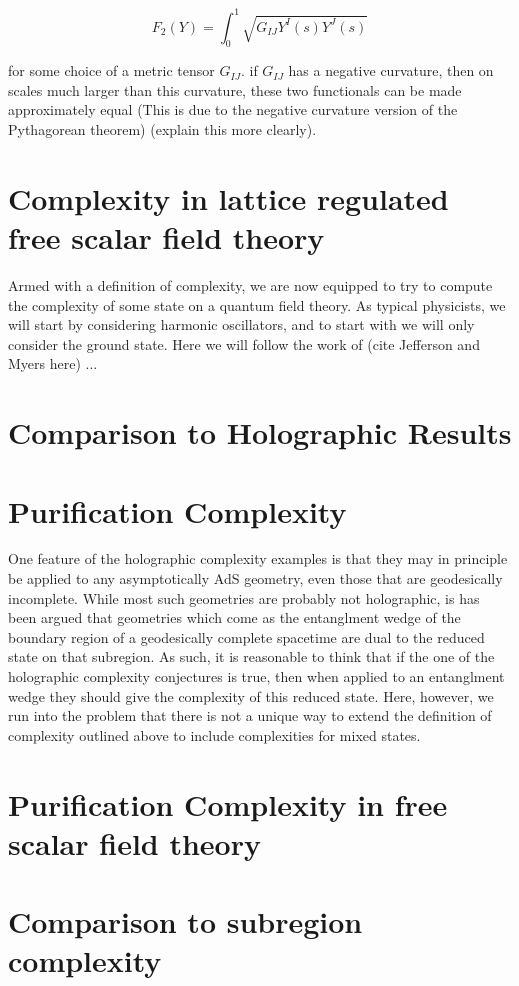 \documentclass[12pt]{amsart}
\begin{document}
$$F_2(Y) = \int_0^1 \sqrt{G_{IJ} Y^I(s) Y^J(s)}$$

for some choice of a metric tensor $G_{IJ}$. if $G_{IJ}$ has a negative curvature, then on scales much larger than this curvature, these two functionals can be made approximately equal (This is due to the negative curvature version of the Pythagorean theorem) (explain this more clearly).

\section{Complexity in lattice regulated free scalar field theory}

Armed with a definition of complexity, we are now equipped to try to compute the complexity of some state on a quantum field theory. As typical physicists, we will start by considering harmonic oscillators, and to start with we will only consider the ground state. Here we will follow the work of (cite Jefferson and Myers here) ...

\section{Comparison to Holographic Results}

\section{Purification Complexity}

One feature of the holographic complexity examples is that they may in principle be applied to any asymptotically AdS geometry, even those that are geodesically incomplete. While most such geometries are probably not holographic, is has been argued that geometries which come as the entanglment wedge of the boundary region of a geodesically complete spacetime are dual to the reduced state on that subregion. As such, it is reasonable to think that if the one of the holographic complexity conjectures is true, then when applied to an entanglment wedge they should give the complexity of this reduced state. Here, however, we run into the problem that there is not a unique way to extend the definition of complexity outlined above to include complexities for mixed states.

\section{Purification Complexity in free scalar field theory}

\section{Comparison to subregion complexity}

%

\nocite{*}
\end{document}
